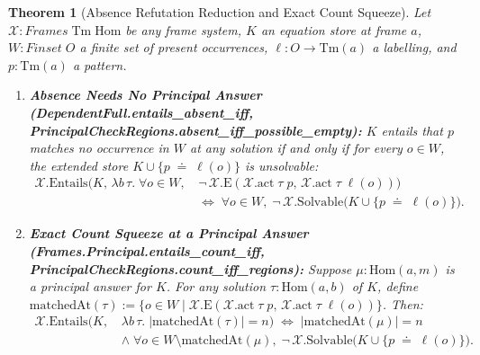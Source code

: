 \documentclass[11pt,a4paper]{article}
\newtheorem{theorem}{Theorem}[section]
\theoremstyle{definition}
\DeclareRobustCommand{\lean}[1]{%
  \ifmmode\text{\normalfont\ttfamily\footnotesize\detokenize{#1}}%
  \else{\normalfont\footnotesize\leanurl{#1}}\fi}
\def\lean#1{#1}%
\newcommand{\doteqStore}{\;\doteq\;}
\begin{document}
\begin{theorem}[Absence Refutation Reduction and Exact Count Squeeze]
\label{thm:absence-count}
Let $\mathcal{X} : \lean{Frames}\;\mathrm{Tm}\;\mathrm{Hom}$ be any frame system, $K$ an equation store at frame $a$, $W : \lean{Finset}\;O$ a finite set of present occurrences, $\ell : O \to \mathrm{Tm}(a)$ a labelling, and $p : \mathrm{Tm}(a)$ a pattern.
\begin{enumerate}[leftmargin=2em, nosep]
  \item \textbf{Absence Needs No Principal Answer (\lean{DependentFull.entails_absent_iff}, \lean{PrincipalCheckRegions.absent_iff_possible_empty}):}
  $K$ entails that $p$ matches no occurrence in $W$ at any solution if and only if for every $o \in W$, the extended store $K \cup \{p \doteqStore \ell(o)\}$ is unsolvable:
  \[
  \begin{aligned}
    \mathcal{X}.\mathrm{Entails}\big(K,\, \lambda b\,\tau.\; \forall o \in W,\, &\neg\,\mathcal{X}.\mathrm{E}(\mathcal{X}.\mathrm{act}\;\tau\;p,\, \mathcal{X}.\mathrm{act}\;\tau\;\ell(o))\big) \\
    &\iff\; \forall o \in W,\; \neg\,\mathcal{X}.\mathrm{Solvable}\big(K \cup \{p \doteqStore \ell(o)\}\big).
  \end{aligned}
  \]
  \item \textbf{Exact Count Squeeze at a Principal Answer (\lean{Frames.Principal.entails_count_iff}, \lean{PrincipalCheckRegions.count_iff_regions}):}
  Suppose $\mu : \mathrm{Hom}(a, m)$ is a principal answer for $K$. For any solution $\tau : \mathrm{Hom}(a, b)$ of $K$, define $\mathrm{matchedAt}(\tau) := \{o \in W \mid \mathcal{X}.\mathrm{E}(\mathcal{X}.\mathrm{act}\;\tau\;p,\, \mathcal{X}.\mathrm{act}\;\tau\;\ell(o))\}$. Then:
  \[
  \begin{aligned}
    \mathcal{X}.\mathrm{Entails}\big(K,\, &\lambda b\,\tau.\; |\mathrm{matchedAt}(\tau)| = n\big) \;\iff\; |\mathrm{matchedAt}(\mu)| = n \\
    &\land\; \forall o \in W \setminus \mathrm{matchedAt}(\mu),\; \neg\,\mathcal{X}.\mathrm{Solvable}\big(K \cup \{p \doteqStore \ell(o)\}\big).
  \end{aligned}
  \]
\end{enumerate}
\end{theorem}
\end{document}
